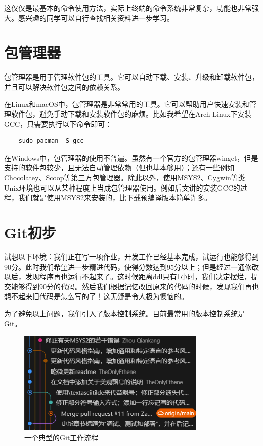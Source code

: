 \documentclass[../main.tex]{subfiles}
\begin{document}
这仅仅是最基本的命令使用方法，实际上终端的命令系统非常复杂，功能也非常强大。感兴趣的同学可以自行查找相关资料进一步学习。

\section{包管理器}

包管理器是用于管理软件包的工具。它可以自动下载、安装、升级和卸载软件包，并且可以解决软件包之间的依赖关系。

在Linux和macOS中，包管理器是非常常用的工具。它可以帮助用户快速安装和管理软件包，避免手动下载和安装软件包的麻烦。比如我希望在Arch Linux下安装GCC，只需要执行以下命令即可：

\begin{lstlisting}
    sudo pacman -S gcc
\end{lstlisting}

在Windows中，包管理器的使用不普遍。虽然有一个官方的包管理器winget，但是支持的软件包较少，且无法自动管理依赖（但也基本够用）；还有一些例如Chocolatey、Scoop等第三方包管理器。除此以外，使用MSYS2、Cygwin等类Unix环境也可以从某种程度上当成包管理器使用。例如后文讲的安装GCC的过程，我们就是使用MSYS2来安装的，比下载预编译版本简单许多。

\section{Git初步}\label{sec:git}

试想以下环境：我们正在写一项作业，开发工作已经基本完成，试运行也能够得到90分。此时我们希望进一步精进代码，使得分数达到95分以上；但是经过一通修改以后，发现程序再也运行不起来了。这时候距离ddl只有1小时，我们决定摆烂，提交能够得到90分的代码。然后我们根据记忆改回原来的代码的时候，发现我们再也想不起来旧代码是怎么写的了！这无疑是令人极为懊恼的。

为了避免以上问题，我们引入了版本控制系统。目前最常用的版本控制系统是Git。

\begin{figure}[htbp]
\centering
\includegraphics[width=0.8\textwidth]{images/git.png}
\caption{一个典型的Git工作流程}
\label{fig:git-workflow}
\end{figure}
\end{document}
